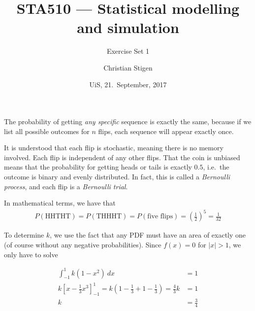 \documentclass[a4paper,english,12pt]{article}
\title{STA510 --- Statistical modelling and simulation}
\subtitle{Exercise Set 1}
\author{Christian Stigen}
\date{UiS, 21.~September, 2017}
\begin{document}
\maketitle

The probability of getting \textit{any specific} sequence is exactly the same,
because if we list all possible outcomes for $n$ flips, each sequence will
appear exactly once.

It is understood that each flip is stochastic, meaning there is no memory
involved. Each flip is independent of any other flips. That the coin is
unbiased means that the probability for getting heads or tails is exactly
$0.5$, i.e.~the outcome is binary and evenly distributed. In fact, this is
called a \textit{Bernoulli process}, and each flip is a \textit{Bernoulli
trial}.

In mathematical terms, we have that
\begin{align*}
  P(\textrm{HHTHT}) = P(\textrm{THHHT}) = P(\textrm{five flips}) =
    \left(\frac{1}{2}\right)^5 = \frac{1}{32}
\end{align*}





To determine $k$, we use the fact that any PDF must have an area of exactly one
(of course without any negative probabilities). Since $f(x) = 0$ for $|x|
> 1$, we only have to solve

\begin{align*}
  \int_{-1}^{1}{k(1-x^2)~dx} &= 1 \\
  k\left[ x - \frac{1}{3}{x^3} \right]_{-1}^{1} =
  k\left( 1 - \frac{1}{3} + 1 - \frac{1}{3} \right) = \frac{4}{3}k &= 1 \\
   k &= \frac{3}{4}
\end{align*}







\end{document}
